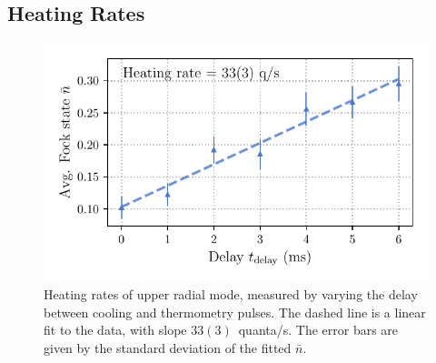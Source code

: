
\subsection{Heating Rates}
\label{sec:Heating}

    \begin{figure}
        \begin{center}
        \noindent\includegraphics[width=0.75\linewidth]{
            figures/pdf_figure/heating_rate.pdf
            }
        \end{center}
        \caption{
            Heating rates of upper radial mode, measured by varying the delay between cooling and thermometry pulses. The dashed line is a linear fit to the data, with slope $33(3)$~quanta/s. The error bars are given by the standard deviation of the fitted $\bar{n}$.
            }
        \label{fig:heating rates}
    \end{figure}

